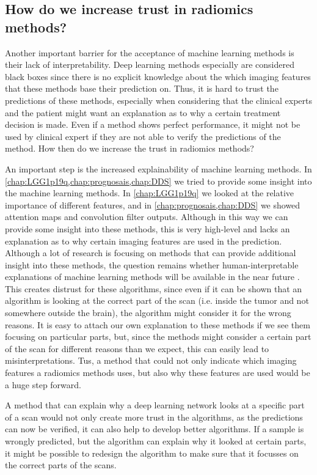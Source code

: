 \subsection{How do we increase trust in radiomics methods?}

Another important barrier for the acceptance of machine learning methods is their lack of interpretability.
Deep learning methods especially are considered black boxes since there is no explicit knowledge about the which imaging features that these methods base their prediction on.
Thus, it is hard to trust the predictions of these methods, especially when considering that the clinical experts and the patient might want an explanation as to why a certain treatment decision is made.
Even if a method shows perfect performance, it might not be used by clinical expert if they are not able to verify the predictions of the method.
How then do we increase the trust in radiomics methods?

An important step is the increased explainability of machine learning methods.
In \cref{chap:LGG1p19q,chap:prognosais,chap:DDS} we  tried to provide some insight into the machine learning methods.
In \cref{chap:LGG1p19q} we looked at the relative importance of different features, and in \cref{chap:prognosais,chap:DDS} we showed attention maps and convolution filter outputs.
Although in this way we can provide some insight into these methods, this is very high-level and lacks an explanation as to why certain imaging features are used in the prediction.
Although a lot of research is focusing on methods that can provide additional insight into these methods, the question remains whether human-interpretable explanations of machine learning methods will be available in the near future \autocite{zhang2018interpretable}.
This creates distrust for these algorithms, since even if it can be shown that an algorithm is looking at the correct part of the scan (i.e. inside the \gls{tumor} and not somewhere outside the brain), the algorithm might consider it for the wrong reasons.
It is easy to attach our own explanation to these methods if we see them focusing on particular parts, but, since the methods might consider a certain part of the scan for different reasons than we expect, this can easily lead to misinterpretations.
Tus, a method that could not only indicate which imaging features a radiomics methods uses, but also why these features are used would be a huge step forward.

A method that can explain why a deep learning network looks at a specific part of a scan would not only create more trust in the algorithms, as the predictions can now be verified, it can also help to develop better algorithms.
If a sample is wrongly predicted, but the algorithm can explain why it looked at certain parts, it might be possible to redesign the algorithm to make sure that it focusses on the correct parts of the scans.

